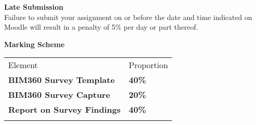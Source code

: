 \textbf{Late Submission}\\
Failure to submit your assignment on or before the date and time indicated on Moodle will result in a penalty of 5\% per day or part thereof.

\vspace{0.5cm}
\textbf{Marking Scheme}

\begin{table}[h!]
     \begin{center}
     \begin{tabular}{p{5cm}  p{5cm} }
     \toprule
      \textbf\large{Element} & \textbf\large{Proportion} \\ 
    \cmidrule(r){1-1}\cmidrule(lr){2-2}
      \textbf{BIM360 Survey Template} & \textbf{40\%}\\
      \textbf{BIM360 Survey Capture} & \textbf{20\%}\\
      \textbf{Report on Survey Findings} & \textbf{40\%}\\
      \\ \bottomrule
      \end{tabular}
      \label{tbl:markSchemeAsmt3}
      \end{center}
 \end{table}


